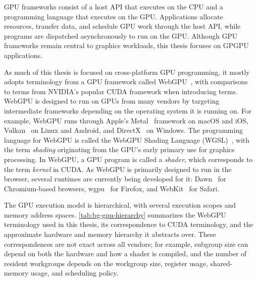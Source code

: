 GPU frameworks consist of a host API that executes on the CPU and a programming language that executes on the GPU. Applications allocate resources, transfer data, and schedule GPU work through the host API, while programs are dispatched asynchronously to run on the GPU. Although GPU frameworks remain central to graphics workloads, this thesis focuses on GPGPU applications.

As much of this thesis is focused on cross-platform GPU programming, it mostly adopts terminology from a GPU framework called WebGPU~\cite{webgpu}, with comparisons to terms from NVIDIA's popular CUDA framework when introducing terms. WebGPU is designed to run on GPUs from many vendors by targeting intermediate frameworks depending on the operating system it is running on. For example, WebGPU runs through Apple's Metal~\cite{apple_metal} framework on macOS and iOS, Vulkan~\cite{vulkan} on Linux and Android, and DirectX~\cite{directx} on Windows. The programming language for WebGPU is called the WebGPU Shading Language (WGSL)~\cite{webgpu-sl}, with the term \textit{shading} originating from the GPU's early primary use for graphics processing. In WebGPU, a GPU program is called a \textit{shader}, which corresponds to the term \textit{kernel} in CUDA. As WebGPU is primarily designed to run in the browser, several runtimes are currently being developed for it: Dawn~\cite{dawn} for Chromium-based browsers, wgpu~\cite{wgpu} for Firefox, and WebKit~\cite{WebKit} for Safari.

The GPU execution model is hierarchical, with several execution scopes and memory address spaces. \mytablong\ref{tab:bg-gpu-hierarchy} summarizes the WebGPU terminology used in this thesis, its correspondence to CUDA terminology, and the approximate hardware and memory hierarchy it abstracts over. These correspondences are not exact across all vendors; for example, subgroup size can depend on both the hardware and how a shader is compiled, and the number of resident workgroups depends on the workgroup size, register usage, shared-memory usage, and scheduling policy.

